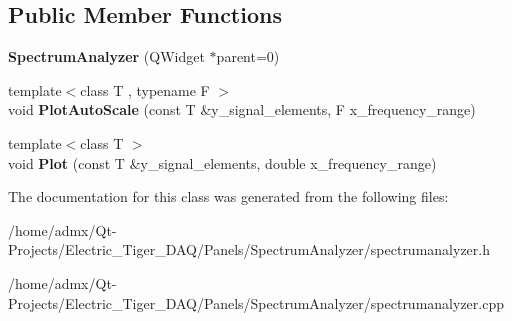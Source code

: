 \subsection*{Public Member Functions}
\begin{DoxyCompactItemize}
\item 
\hypertarget{class_spectrum_analyzer_aef258c587abbeb0b11cb765e5aeee636}{{\bfseries Spectrum\+Analyzer} (Q\+Widget $\ast$parent=0)}\label{class_spectrum_analyzer_aef258c587abbeb0b11cb765e5aeee636}

\item 
\hypertarget{class_spectrum_analyzer_ae63398cc69e47a9b3aa463ebbc8ccb1b}{{\footnotesize template$<$class T , typename F $>$ }\\void {\bfseries Plot\+Auto\+Scale} (const T \&y\+\_\+signal\+\_\+elements, F x\+\_\+frequency\+\_\+range)}\label{class_spectrum_analyzer_ae63398cc69e47a9b3aa463ebbc8ccb1b}

\item 
\hypertarget{class_spectrum_analyzer_a102f90cf20b6e157dc9e95d11847c2c1}{{\footnotesize template$<$class T $>$ }\\void {\bfseries Plot} (const T \&y\+\_\+signal\+\_\+elements, double x\+\_\+frequency\+\_\+range)}\label{class_spectrum_analyzer_a102f90cf20b6e157dc9e95d11847c2c1}

\end{DoxyCompactItemize}


The documentation for this class was generated from the following files\+:\begin{DoxyCompactItemize}
\item 
/home/admx/\+Qt-\/\+Projects/\+Electric\+\_\+\+Tiger\+\_\+\+D\+A\+Q/\+Panels/\+Spectrum\+Analyzer/spectrumanalyzer.\+h\item 
/home/admx/\+Qt-\/\+Projects/\+Electric\+\_\+\+Tiger\+\_\+\+D\+A\+Q/\+Panels/\+Spectrum\+Analyzer/spectrumanalyzer.\+cpp\end{DoxyCompactItemize}

